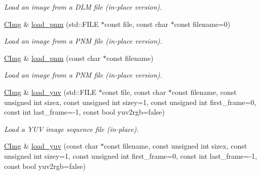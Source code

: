 \begin{DoxyCompactItemize}
\begin{DoxyCompactList}\small\item\em Load an image from a DLM file (in-\/place version). \item\end{DoxyCompactList}\item 
\hypertarget{structcimg__library_1_1_c_img_ac8adaddeddadebd69a6bb11e1a1d8e00}{
\hyperlink{structcimg__library_1_1_c_img}{CImg} \& \hyperlink{structcimg__library_1_1_c_img_ac8adaddeddadebd69a6bb11e1a1d8e00}{load\_\-pnm} (std::FILE $\ast$const file, const char $\ast$const filename=0)}
\label{structcimg__library_1_1_c_img_ac8adaddeddadebd69a6bb11e1a1d8e00}

\begin{DoxyCompactList}\small\item\em Load an image from a PNM file (in-\/place version). \item\end{DoxyCompactList}\item 
\hypertarget{structcimg__library_1_1_c_img_ad965659f2570bce67e41088731ea378d}{
\hyperlink{structcimg__library_1_1_c_img}{CImg} \& \hyperlink{structcimg__library_1_1_c_img_ad965659f2570bce67e41088731ea378d}{load\_\-pnm} (const char $\ast$const filename)}
\label{structcimg__library_1_1_c_img_ad965659f2570bce67e41088731ea378d}

\begin{DoxyCompactList}\small\item\em Load an image from a PNM file (in-\/place version). \item\end{DoxyCompactList}\item 
\hypertarget{structcimg__library_1_1_c_img_aedcee61e00a196d9fb50d8207f917616}{
\hyperlink{structcimg__library_1_1_c_img}{CImg} \& \hyperlink{structcimg__library_1_1_c_img_aedcee61e00a196d9fb50d8207f917616}{load\_\-yuv} (std::FILE $\ast$const file, const char $\ast$const filename, const unsigned int sizex, const unsigned int sizey=1, const unsigned int first\_\-frame=0, const int last\_\-frame=-\/1, const bool yuv2rgb=false)}
\label{structcimg__library_1_1_c_img_aedcee61e00a196d9fb50d8207f917616}

\begin{DoxyCompactList}\small\item\em Load a YUV image sequence file (in-\/place). \item\end{DoxyCompactList}\item 
\hypertarget{structcimg__library_1_1_c_img_ae4a2eaf5669c58534338e103bc5c8087}{
\hyperlink{structcimg__library_1_1_c_img}{CImg} \& \hyperlink{structcimg__library_1_1_c_img_ae4a2eaf5669c58534338e103bc5c8087}{load\_\-yuv} (const char $\ast$const filename, const unsigned int sizex, const unsigned int sizey=1, const unsigned int first\_\-frame=0, const int last\_\-frame=-\/1, const bool yuv2rgb=false)}
\label{structcimg__library_1_1_c_img_ae4a2eaf5669c58534338e103bc5c8087}


\end{DoxyCompactItemize}
